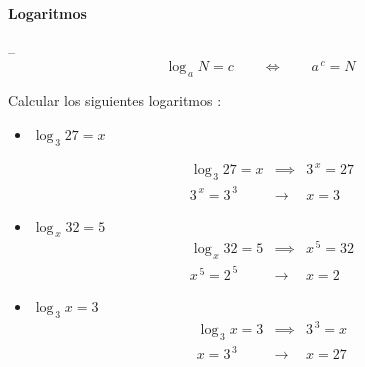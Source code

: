 \documentclass[12pt]{scrbook}
\begin{document}
\paragraph*{Logaritmos} -- 
$$
\log_{\,a} N = c \qquad\iff\qquad a^{\,c} = N
$$

\noindent Calcular los siguientes logaritmos :
\begin{itemize}
\item{$\log_{\,3} 27 = x$

\begin{eqnarray*}
\log_{\,3} 27 = x &\implies& 3^{\,x} = 27 \\
3^{\,x} = 3^{\,3} &\to& x = 3 
\end{eqnarray*}
}
\item{$\log_{\,x} 32 = 5$
\begin{eqnarray*}
\log_{\,x} 32 = 5 &\implies& x^{\,5} = 32 \\
x^{\,5} = 2^{\,5} &\to& x = 2
\end{eqnarray*}
}
\item{$\log_{\,3} x = 3$
\begin{eqnarray*}
\log_{\,3} x = 3 &\implies& 3^{\,3} = x \\
x = 3^{\,3} &\to& x = 27
\end{eqnarray*}
}
\end{itemize}
\end{document}
